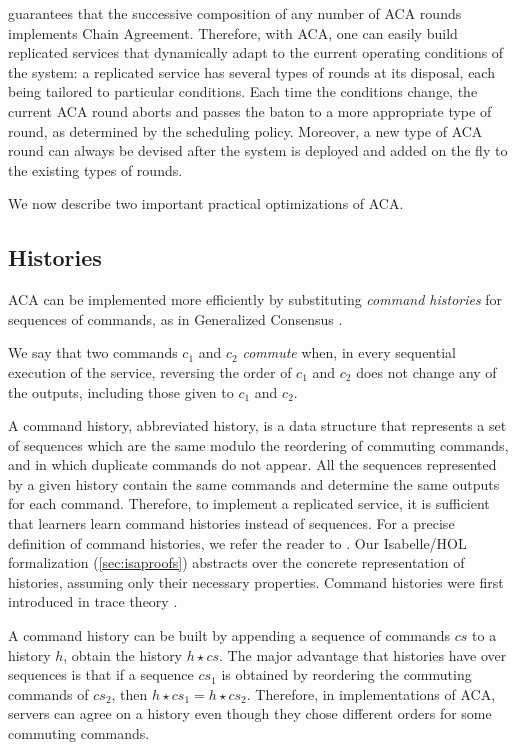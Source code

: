  guarantees that the successive composition of any
number of ACA rounds implements Chain Agreement.
Therefore, with ACA, one can easily build replicated services that
dynamically adapt to the current operating conditions of the system: a
replicated service has several types of rounds at its disposal, each being
tailored to particular conditions. Each time the conditions change,
the current ACA round aborts and passes the baton to a more 
appropriate type of round, as determined by the scheduling policy. Moreover, a new type
of ACA round can always be devised after the system is deployed and added on the fly to
the existing types of rounds.

We now describe two important practical optimizations of ACA.

\subsection{Histories}
\label{sec:histories}

ACA can be implemented more efficiently by substituting \emph{command histories} for sequences of commands, as in Generalized Consensus \cite{Lamport05GeneralizeConsensus}.

We say that two commands $c_1$ and $c_2$ \emph{commute} when, in every sequential
execution of the service, reversing the order of $c_1$ and $c_2$ does
not change any of the outputs, including those given to $c_1$ and
$c_2$.

A command history, abbreviated history, is a data structure that
represents a set of sequences which are the same modulo the reordering
of commuting commands, and in which duplicate commands do not appear.
All the sequences represented by a given history contain the same
commands and determine the same outputs for each command.  Therefore,
to implement a replicated service, it is sufficient that learners
learn command histories instead of sequences.  For a precise
definition of command histories, we refer the reader to
\cite{Lamport05GeneralizeConsensus}. Our Isabelle/HOL formalization
(\cref{sec:isaproofs}) abstracts
over the concrete representation of histories, assuming only their necessary
properties. Command histories were first
introduced in trace theory \cite{Mazurkiewicz84Semantics}.

A command history can be built by appending a sequence of commands
$cs$ to a history $h$, obtain the history $h \star cs$.  The major
advantage that histories have over sequences is that if a sequence
$cs_1$ is obtained by reordering the commuting commands of $cs_2$,
then $h \star cs_1 = h \star cs_2$. Therefore, in  implementations of
ACA, servers can agree on a history even though
they chose different orders for some commuting commands.

